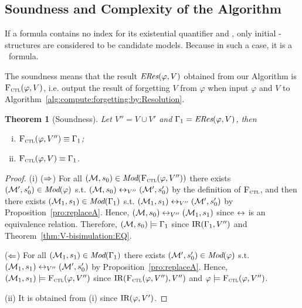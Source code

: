 \documentclass{article}
\newtheorem{theorem}{Theorem}
\begin{document}
\subsection{Soundness and Complexity of the Algorithm}
If a formula contains no index for its existential quantifier and \start, only initial \MPK-structures are considered to be candidate models. Because in such a case, it is a \CTL\ formula.%

The soundness means that the result $\emph{ERes}(\varphi,V)$ obtained from our Algorithm is ${\textsc{F}_{\textsc{ctl}}}(\varphi, V)$, i.e. output the result of forgetting $V$ from $\varphi$ when input $\varphi$ and $V$ to Algorithm~\ref{alg:compute:forgetting:by:Resolution}.
\begin{theorem}[Soundness]\label{thm:Res_based:V_CTLforget}
Let $V''=V \cup V'$ and $\Gamma_1=\emph{ERes}(\varphi,V)$, then %
\begin{enumerate}[(i)]
\item ${\textsc{F}_{\textsc{ctl}}}(\varphi, V'') \equiv \Gamma_1$;
\item ${\textsc{F}_{\textsc{ctl}}}(\varphi, V) \equiv \Gamma_1$.
\end{enumerate}
\end{theorem}
\begin{proof}
(i) ($\Rightarrow$) For all $({\cal M},s_0) \in \textit{Mod}({\textsc{F}_{\textsc{ctl}}}(\varphi, V''))$ there exists $({\cal M}',s_0') \in \textit{Mod}(\varphi)$ s.t. $({\cal M},s_0) \leftrightarrow_{V''} ({\cal M}', s_0')$ by the definition of ${\textsc{F}_{\textsc{ctl}}}$, and then there exists $({\cal M}_1, s_1) \in \textit{Mod}(\Gamma_1)$ s.t. $({\cal M}_1,s_1) \leftrightarrow_{V''} ({\cal M}', s_0')$ by Proposition~\ref{pro:replaceA}. Hence, $({\cal M},s_0) \leftrightarrow_{V''} ({\cal M}_1,s_1)$ since  $\leftrightarrow$ is an equivalence relation.
Therefore, $({\cal M},s_0) \models \Gamma_1$ since $\textrm{IR}(\Gamma_1, V'')$ and Theorem~\ref{thm:V-bisimulation:EQ}.

 ($\Leftarrow$)  For all $({\cal M}_1, s_1) \in \textit{Mod}(\Gamma_1)$ there exists $({\cal M}',s_0') \in \textit{Mod}(\varphi)$ s.t. $({\cal M}_1,s_1) \leftrightarrow_{V''} ({\cal M}', s_0')$ by Proposition~\ref{pro:replaceA}. Hence, $({\cal M}_1, s_1) \models {\textsc{F}_{\textsc{ctl}}}(\varphi, V'')$ since $\textrm{IR}({\textsc{F}_{\textsc{ctl}}}(\varphi, V''), V'')$ and $\varphi \models {\textsc{F}_{\textsc{ctl}}}(\varphi, V'')$.

 (ii) It is obtained from (i) since $\textrm{IR}(\varphi, V')$.
\end{proof}
\end{document}
